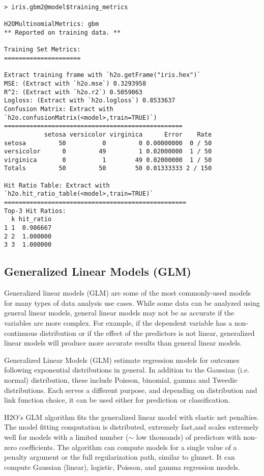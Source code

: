 {{\begin{lstlisting}[style=R]
> iris.gbm2@model$training_metrics

H2OMultinomialMetrics: gbm
** Reported on training data. **

Training Set Metrics: 
=====================

Extract training frame with `h2o.getFrame("iris.hex")`
MSE: (Extract with `h2o.mse`) 0.3293958
R^2: (Extract with `h2o.r2`) 0.5059063
Logloss: (Extract with `h2o.logloss`) 0.8533637
Confusion Matrix: Extract with `h2o.confusionMatrix(<model>,train=TRUE)`)
=================================================
           setosa versicolor virginica      Error    Rate
setosa         50          0         0 0.00000000  0 / 50
versicolor      0         49         1 0.02000000  1 / 50
virginica       0          1        49 0.02000000  1 / 50
Totals         50         50        50 0.01333333 2 / 150

Hit Ratio Table: Extract with `h2o.hit_ratio_table(<model>,train=TRUE)`
==================================================
Top-3 Hit Ratios:
  k hit_ratio
1 1  0.986667
2 2  1.000000
3 3  1.000000

\end{lstlisting}

\subsection{Generalized Linear Models (GLM)}


Generalized linear models (GLM) are some of the most commonly-used models for many types of data analysis use cases. While some data can be analyzed using general linear models, general linear models may not be as accurate if the variables are more complex. For example, if the dependent variable has a non-continuous distribution or if the effect of the predictors is not linear, generalized linear models will produce more accurate results than general linear models.  

Generalized Linear Models (GLM) estimate regression models for outcomes following exponential distributions in general. In addition to the Gaussian (i.e. normal) distribution, these include Poisson, binomial, gamma and Tweedie distributions. Each serves a different purpose, and depending on distribution and link function choice, it can be used either for prediction or classification.

H2O's GLM algorithm fits the generalized linear model with elastic net penalties. The model fitting computation is distributed, extremely fast,and scales extremely well for models with a limited number ($\sim$ low thousands) of predictors with non-zero coefficients. The algorithm can compute models for a single value of a penalty argument or the full regularization path, similar to glmnet. It can compute Gaussian (linear), logistic, Poisson, and gamma regression models.


}}
